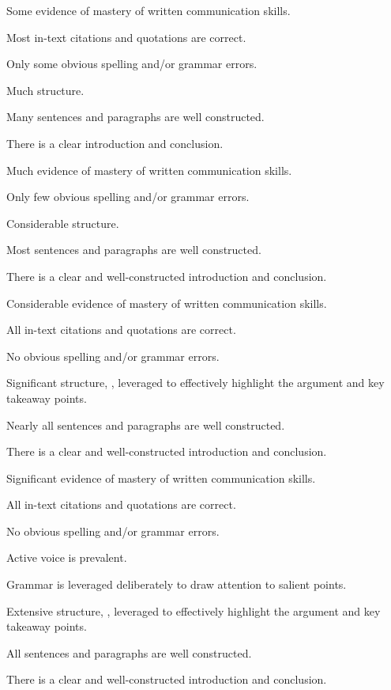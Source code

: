 \documentclass{../../fal_assignment}
\begin{document}
\begin{markingrubric}
        \grade 		Some evidence of mastery of written communication skills.
        \par 		Most in-text citations and quotations are correct.
        \par 		Only some obvious spelling and/or grammar errors.
        \par 		Much structure.   
        \par 		Many sentences and paragraphs are well constructed.
        \par 		There is a clear introduction and conclusion.
        
        \grade 		Much evidence of mastery of written communication skills.

        \par 		Only few obvious spelling and/or grammar errors.
        \par 		Considerable structure.   
        \par 		Most sentences and paragraphs are well constructed.
        \par 		There is a clear and well-constructed introduction and conclusion.
        
        \grade 		Considerable evidence of mastery of written communication skills.
        \par 		All in-text citations and quotations are correct.
        \par 		No obvious spelling and/or grammar errors.
        \par 		Significant structure, , leveraged to effectively highlight the argument and key takeaway points.  
        \par 		Nearly all sentences and paragraphs are well constructed.
        \par 		There is a clear and well-constructed introduction and conclusion.
        
        \grade 		Significant evidence of mastery of written communication skills.
        \par 		All in-text citations and quotations are correct.
        \par 		No obvious spelling and/or grammar errors.
       \par 		Active voice is prevalent.
        \par 		Grammar is leveraged deliberately to draw attention to salient points.     
        \par 		Extensive structure, , leveraged to effectively highlight the argument and key takeaway points. 
        \par 		All sentences and paragraphs are well constructed.
        \par 		There is a clear and well-constructed introduction and conclusion.
        

\end{markingrubric}
\end{document}
